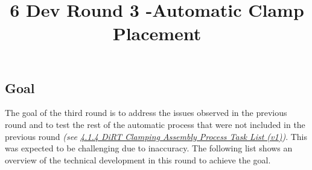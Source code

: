 \documentclass[11pt]{book}
\title{6 Dev Round 3 -Automatic Clamp Placement}
\begin{document}
\maketitle

\vspace{1\baselineskip}
\subsection{Goal}

The goal of the third round is to address the issues observed in the previous round and to test the rest of the automatic process that were not included in the previous round \textit{\textcolor[HTML]{B7B7B7}{(see \uline{4.1.4 DiRT Clamping Assembly Process Task List (v1)})}}. This was expected to be challenging due to inaccuracy. The following list shows an overview of the technical development in this round to achieve the goal. 
\end{document}
